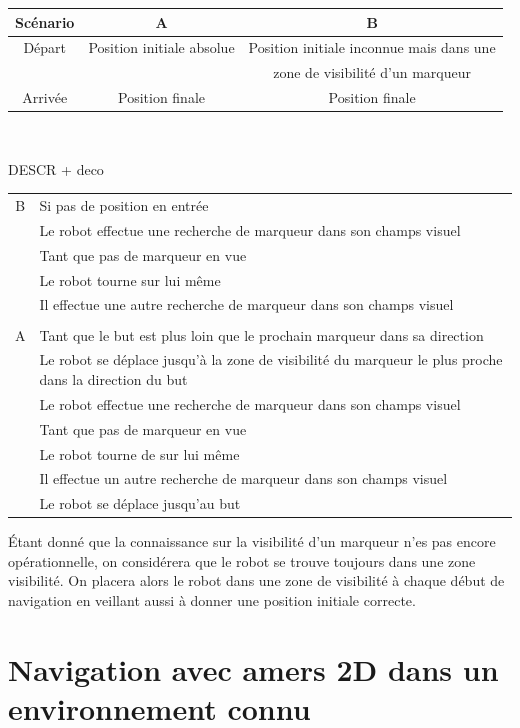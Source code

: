 \documentclass[10pt,a4paper]{article}
\begin{document}
\begin{center}
\begin{tabular}{c|c|c}
Scénario & A & B \\ \hline
Départ & Position initiale absolue & Position initiale inconnue mais dans une \\ 
  &  & zone de visibilité d'un marqueur \\  \hline
Arrivée & Position finale & Position finale 
\end{tabular}\\
\end{center}

DESCR + deco\\
\begin{tabular}{cl}
B & Si pas de position en entrée  \\
  & Le robot effectue une recherche de marqueur dans son champs visuel \\
  & Tant que pas de marqueur en vue \\
  & Le robot tourne sur lui même \\
  & Il effectue une autre recherche de marqueur dans son champs visuel \\
& \\
A & Tant que le but est plus loin que le prochain marqueur dans sa direction \\
  & Le robot se déplace jusqu'à la zone de visibilité du marqueur le plus proche dans la direction du but  \\
  & Le robot effectue une recherche de marqueur dans son champs visuel \\
  & Tant que pas de marqueur en vue  \\
  & Le robot tourne de sur lui même  \\
  & Il effectue un autre recherche de marqueur dans son champs visuel \\
  & Le robot se déplace jusqu'au but  \\
\end{tabular}

Étant donné que la connaissance sur la visibilité d'un marqueur n'es pas encore opérationnelle, on considérera que le robot se trouve toujours dans une zone visibilité. On placera alors le robot dans une zone de visibilité à chaque début de navigation en veillant aussi à donner une position initiale correcte.

\section{Navigation avec amers 2D dans un environnement connu}
\label{sec:navigation_avec_amers_2D_dans_un_environnement_connu}
\end{document}
